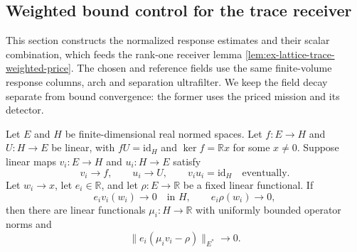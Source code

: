 \subsection{Weighted bound control for the trace receiver}
\label{sec:ex-lattice-trace-weighted-estimates}

This section constructs the normalized response estimates and their scalar
combination, which feeds the rank-one receiver lemma
\ref{lem:ex-lattice-trace-weighted-price}. The chosen and reference fields use the same finite-volume response columns,
arch and separation ultrafilter. We keep the field decay separate from
bound convergence: the former uses the priced mission and its detector.

\begin{lemma}
\label{lem:ex-lattice-trace-weighted-price}
Let $E$ and $H$ be finite-dimensional real normed spaces. Let
$f:E\to H$ and $U:H\to E$ be linear, with $fU=\mathrm{id}_H$ and
$\ker f=\mathbb R x$ for some $x\ne0$. Suppose linear maps
$v_i:E\to H$ and $u_i:H\to E$ satisfy
\[
 v_i\longrightarrow f,\qquad u_i\longrightarrow U,
 \qquad v_i u_i=\mathrm{id}_H\quad\text{eventually}.
\]
Let $w_i\to x$, let $e_i\in\mathbb R$, and let $\rho:E\to\mathbb R$
be a fixed linear functional. If
\[
 e_i v_i(w_i)\longrightarrow0\quad\text{in }H,
 \qquad e_i\rho(w_i)\longrightarrow0,
\]
then there are linear functionals $\mu_i:H\to\mathbb R$ with uniformly
bounded operator norms and
\[
 \bigl\|e_i(\mu_i v_i-\rho)\bigr\|_{E^*}\longrightarrow0.
\]
\end{lemma}
